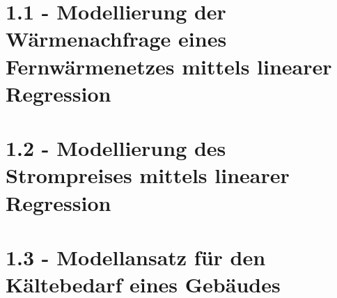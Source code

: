 \documentclass{eegreport}
\begin{document}
\mytitlepage
{} 
\tableofcontents 
{} 

\newpage

\section{1.1 - Modellierung der Wärmenachfrage eines Fernwärmenetzes mittels linearer Regression}

\section{1.2 - Modellierung des Strompreises mittels linearer Regression}

\section{1.3 - Modellansatz für den Kältebedarf eines Gebäudes}

\newpage
\appendix


\newpage

\end{document}
